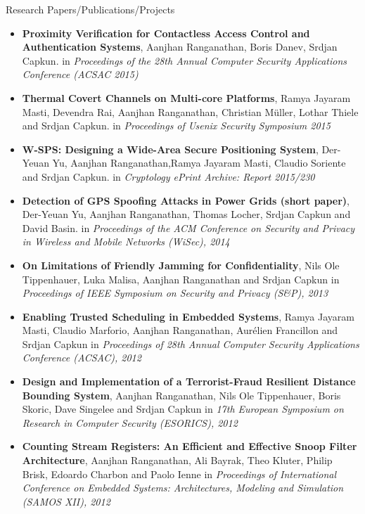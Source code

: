 \documentclass[11pt,oneside]{article}
\newenvironment{ressection}[1]{
	\vspace{4pt}
	{\fontfamily{phv}\selectfont\Large#1}
	\begin{itemize}
	\vspace{3pt}
}{
	\end{itemize}
}
\newcommand{\resitem}[1]{
	\vspace{-4pt}
	\item \begin{flushleft} #1 \end{flushleft}
}
\begin{document}
\begin{ressection}{Research Papers/Publications/Projects}

\resitem{\textbf{Proximity Verification for Contactless Access Control and Authentication Systems},
    Aanjhan Ranganathan, Boris Danev, Srdjan Capkun.
    in \emph{Proceedings of the 28th Annual Computer Security Applications Conference (ACSAC 2015)}}

 \resitem{\textbf{Thermal Covert Channels on Multi-core Platforms},
    Ramya Jayaram Masti, Devendra Rai, Aanjhan Ranganathan, Christian Müller, Lothar Thiele and Srdjan Capkun.
    in \emph{Proceedings of Usenix Security Symposium 2015}}

 \resitem{\textbf{W-SPS: Designing a Wide-Area Secure Positioning System},
    Der-Yeuan Yu, Aanjhan Ranganathan,Ramya Jayaram Masti, Claudio Soriente and Srdjan Capkun.
    in \emph{Cryptology ePrint Archive: Report 2015/230}}

 \resitem{\textbf{Detection of GPS Spoofing Attacks in Power Grids (short paper)},
    Der-Yeuan Yu, Aanjhan Ranganathan, Thomas Locher, Srdjan Capkun and David Basin.
    in \emph{Proceedings of the ACM Conference on Security and Privacy
          in Wireless and Mobile Networks (WiSec), 2014}}

  \resitem{\textbf{On Limitations of Friendly Jamming for Confidentiality},
    Nils Ole Tippenhauer, Luka Malisa, Aanjhan Ranganathan and Srdjan Capkun
    in \emph{Proceedings of IEEE Symposium on Security and Privacy (S\&P),
      2013}}

  \resitem{\textbf{Enabling Trusted Scheduling in Embedded Systems}, Ramya
    Jayaram Masti, Claudio Marforio, Aanjhan Ranganathan, Aur\'elien
    Francillon and Srdjan Capkun in \emph{Proceedings of 28th Annual Computer
      Security Applications Conference (ACSAC), 2012}}

        \resitem{\textbf{Design and Implementation of a Terrorist-Fraud Resilient
          Distance Bounding System}, Aanjhan Ranganathan, Nils Ole
          Tippenhauer, Boris Skoric, Dave Singelee and Srdjan Capkun in \emph{17th
          European Symposium on Research in Computer Security (ESORICS), 2012}}

        \resitem{\textbf{Counting Stream Registers: An Efficient and Effective Snoop
          Filter Architecture}, Aanjhan Ranganathan, Ali Bayrak, Theo Kluter,
          Philip Brisk, Edoardo Charbon and Paolo Ienne in \emph{Proceedings of
          International Conference on Embedded Systems: Architectures,
          Modeling and Simulation (SAMOS XII), 2012}}


\end{ressection}
\end{document}
